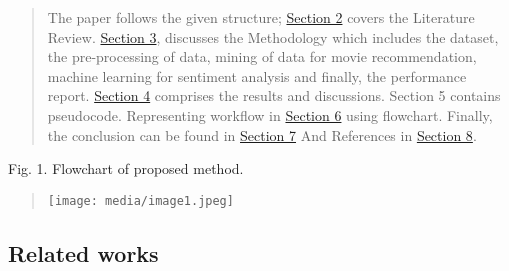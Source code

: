 \documentclass[
]{article}
\begin{document}
\begin{quote}
The paper follows the given structure;
\protect\hyperlink{related-works}{Section 2} covers the Literature
Review. \protect\hyperlink{methodology}{Section 3}, discusses the
Methodology which includes the dataset, the pre-processing of data,
mining of data for movie recommendation, machine learning for sentiment
analysis and ﬁnally, the performance report.
\protect\hyperlink{_bookmark10}{Section 4} comprises the results and
discussions. Section 5 contains pseudocode. Representing workflow in
\protect\hyperlink{flowchart}{Section 6} using flowchart. Finally, the
conclusion can be found in \protect\hyperlink{conclusion}{Section 7} And
References in \protect\hyperlink{references}{Section 8}.
\end{quote}

Fig. 1. Flowchart of proposed method.

\begin{quote}
\texttt{[image: media/image1.jpeg]}
\end{quote}

\hypertarget{related-works}{%
\subsection{Related works}\label{related-works}}
\end{document}
